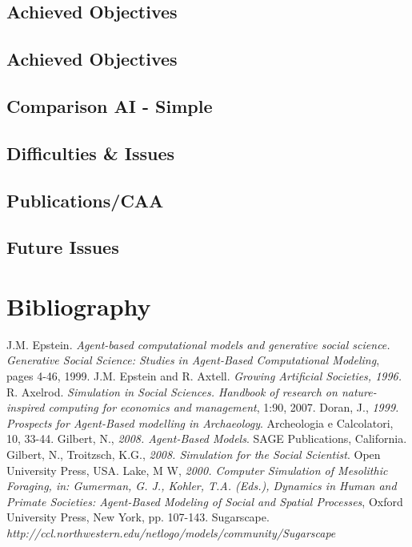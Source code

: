 \documentclass{report}
\begin{document}
      \section{Achieved Objectives}
      \section{Achieved Objectives}
      \section{Comparison AI - Simple}
      \section{Difficulties \& Issues}
      \section{Publications/CAA}
      \section{Future Issues}
\newpage 
\chapter{Bibliography}
\begin{thebibliography}{9}
\bibitem{[1]} 
J.M. Epstein. 
\emph{Agent-based computational models and generative social science. Generative Social
Science: Studies in Agent-Based Computational Modeling}, pages 4-46, 1999.
\bibitem{[2]} 
J.M. Epstein and R. Axtell.
\emph{Growing Artificial Societies, 1996.}
\bibitem{[3]} 
R. Axelrod. 
\emph{Simulation in Social Sciences. Handbook of research on nature-inspired computing for economics and management}, 1:90, 2007.
\bibitem{[4]}
Doran, J., 
\emph{1999. Prospects for Agent-Based modelling in Archaeology}. Archeologia e Calcolatori, 10, 33-44.
\bibitem{[5]}
Gilbert, N.,
\emph{2008. Agent-Based Models}. SAGE Publications, California.
\bibitem{[6]}
Gilbert, N., Troitzsch, K.G.,
\emph{2008. Simulation for the Social Scientist}. Open University Press, USA.
\bibitem{[7]}
Lake, M W,
\emph{2000. Computer Simulation of Mesolithic Foraging, in: Gumerman, G. J., Kohler, T.A. (Eds.), Dynamics in Human and Primate Societies: Agent-Based Modeling of Social and Spatial Processes}, Oxford University Press, New York, pp. 107-143.
\bibitem{[8]}
Sugarscape.
\emph{http://ccl.northwestern.edu/netlogo/models/community/Sugarscape}
\end{thebibliography}
\end{document}
